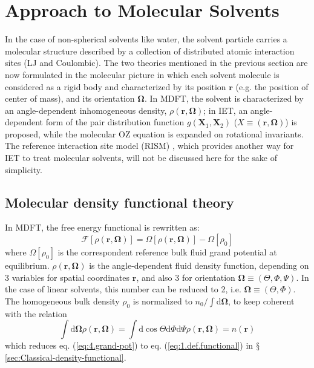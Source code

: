 
\chapter{Approach to Molecular Solvents\label{chpt:iem-mdft}}

In the case of non-spherical solvents like water, the solvent particle
carries a molecular structure described by a collection of distributed
atomic interaction sites (LJ and Coulombic). The two theories mentioned
in the previous section are now formulated in the molecular picture
in which each solvent molecule is considered as a rigid body and characterized
by its position $\mathbf{r}$ (e.g. the position of center of mass),
and its orientation $\mathbf{\Omega}$. In \acs{MDFT}, the solvent
is characterized by an angle-dependent inhomogeneous density, $\rho(\mathbf{r},\mathbf{\Omega})$;
in \acs{IET}, an angle-dependent form of the pair distribution function
$g(\mathbf{X}_{1},\mathbf{X}_{2})$ ($X\equiv(\mathbf{r},\mathbf{\Omega})$)
is proposed, while the molecular \acs{OZ} equation is expanded on
rotational invariants. The reference interaction site model (RISM)
\citep{hirata_molecular_2004}, which provides another way for \acs{IET}
to treat molecular solvents, will not be discussed here for the sake of simplicity.

\section{Molecular density functional theory}

In \acf{MDFT}, the free energy functional is rewritten as:
\begin{equation}
\mathcal{F}[\rho(\mathbf{r},\mathbf{\Omega})]=\varOmega[\rho(\mathbf{r},\mathbf{\Omega})]-\varOmega[\rho_{0}]\label{eq:4.grand-pot}
\end{equation}
where $\varOmega[\rho_{0}]$ is the correspondent reference bulk fluid
grand potential at equilibrium. $\rho(\mathbf{r},\mathbf{\Omega})$
is the angle-dependent fluid density function, depending on 3 variables
for spatial coordinates $\mathbf{r}$, and also 3 for orientation
$\mathbf{\Omega}\equiv(\Theta,\Phi,\Psi)$. In the case of linear solvents,
this number can be reduced to 2, i.e. $\mathbf{\Omega}\equiv(\Theta,\Phi)$.
The homogeneous bulk density $\rho_{0}$ is normalized to $n_{0}/\int\mathrm{d}\mathbf{\Omega}$,
to keep coherent with the relation
\begin{equation}
\int\mathrm{d}\mathbf{\Omega}\rho(\mathbf{r},\mathbf{\Omega})=\int\mathrm{d}\cos\Theta\mathrm{d}\Phi\mathrm{d}\Psi\rho(\mathbf{r},\mathbf{\Omega})=n(\mathbf{r})
\end{equation}
which reduces eq. (\ref{eq:4.grand-pot}) to eq. (\ref{eq:1.def.functional})
in $\mathsection$\ref{sec:Classical-density-functional}.

